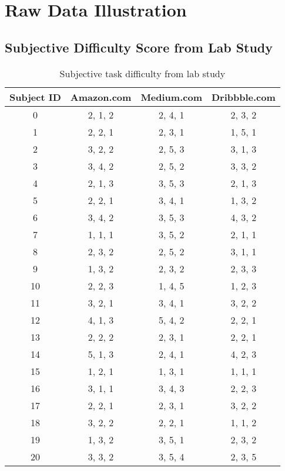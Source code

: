 \section{Raw Data Illustration}
\label{appendix:c}

\subsection{Subjective Difficulty Score from Lab Study}

\begin{table}[H]
      \small
      \centering
      \setlength{\belowcaptionskip}{10pt}
      \caption{Subjective task difficulty from lab study}

      \begin{tabular}{cccc}
            \toprule
            \textbf{Subject ID} & \textbf{Amazon.com} & \textbf{Medium.com} & \textbf{Dribbble.com} \\
            \hline
            0 & 2, 1, 2 & 2, 4, 1 & 2, 3, 2 \\
            1 & 2, 2, 1 & 2, 3, 1 & 1, 5, 1 \\
            2 & 3, 2, 2 & 2, 5, 3 & 3, 1, 3 \\
            3 & 3, 4, 2 & 2, 5, 2 & 3, 3, 2 \\
            4 & 2, 1, 3 & 3, 5, 3 & 2, 1, 3 \\
            5 & 2, 2, 1 & 3, 4, 1 & 1, 3, 2 \\
            6 & 3, 4, 2 & 3, 5, 3 & 4, 3, 2 \\
            7 & 1, 1, 1 & 3, 5, 2 & 2, 1, 1 \\
            8 & 2, 3, 2 & 2, 5, 2 & 3, 1, 1 \\
            9 & 1, 3, 2 & 2, 3, 2 & 2, 3, 3 \\
            10 & 2, 2, 3 & 1, 4, 5 & 1, 2, 3 \\
            11 & 3, 2, 1 & 3, 4, 1 & 3, 2, 2 \\
            12 & 4, 1, 3 & 5, 4, 2 & 2, 2, 1 \\
            13 & 2, 2, 2 & 2, 3, 1 & 2, 2, 1 \\
            14 & 5, 1, 3 & 2, 4, 1 & 4, 2, 3 \\
            15 & 1, 2, 1 & 1, 3, 1 & 1, 1, 1 \\
            16 & 3, 1, 1 & 3, 4, 3 & 2, 2, 3 \\
            17 & 2, 2, 1 & 2, 3, 1 & 3, 2, 2 \\
            18 & 3, 2, 2 & 2, 2, 1 & 1, 1, 2 \\
            19 & 1, 3, 2 & 3, 5, 1 & 2, 3, 2 \\
            20 & 3, 3, 2 & 3, 5, 4 & 2, 3, 5 \\
            \bottomrule
      \end{tabular}
      \label{table:diff}
\end{table}
